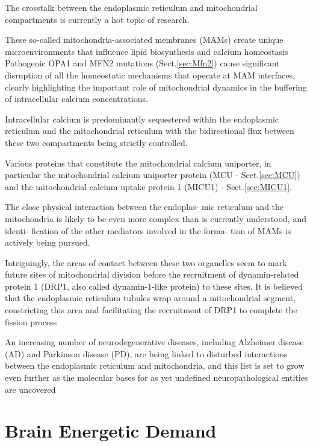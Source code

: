 The crosstalk between the endoplasmic reticulum and mitochondrial compartments
is currently a hot topic of research.

These so-called mitochondria-associated membranes (MAMs) create unique
microenvironments that influence lipid biosynthesis and calcium homeostasis
Pathogenic OPA1 and MFN2 mutations (Sect.\ref{sec:Mfn2}) cause significant
disruption of all the homeostatic mechanisms that operate at MAM interfaces,
clearly highlighting the important role of mitochondrial dynamics in the
buffering of intracellular calcium concentrations.

Intracellular calcium is predominantly sequestered within the endoplasmic
reticulum and the mitochondrial reticulum with the bidirectional flux between
these two compartments being strictly controlled.

Various proteins that constitute the mitochondrial calcium uniporter, in
particular the mitochondrial calcium uniporter protein (MCU -
Sect.\ref{sec:MCU}) and the mitochondrial calcium uptake protein 1 (MICU1) -
Sect.\ref{sec:MICU1}.

The close physical interaction between the endoplas- mic reticulum and the
mitochondria is likely to be even more complex than is currently understood, and
identi- fication of the other mediators involved in the forma- tion of MAMs is
actively being pursued.

Intriguingly, the areas of contact between these two organelles seem to mark
future sites of mitochondrial division before the recruitment of dynamin-related
protein 1 (DRP1, also called dynamin-1-like protein) to these sites.
It is believed that the endoplasmic reticulum tubules wrap around a
mitochondrial segment, constricting this area and facilitating the recruitment
of DRP1 to complete the fission process

\begin{mdframed}

An increasing number of neurodegenerative diseases, including Alzheimer
disease (AD) and Parkinson disease (PD), are being linked to disturbed
interactions between the endoplasmic reticulum and mitochondria, and this list
is set to grow even further as the molecular bases for as yet undefined
neuropathological entities are uncovered

\end{mdframed}

\chapter{Brain Energetic Demand}
\label{chap:brain-energetic-demand}


